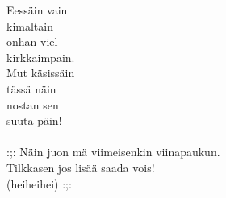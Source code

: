
Eessäin vain \\ kimaltain \\ onhan viel \\ kirkkaimpain. \\ Mut käsissäin \\ tässä näin \\ nostan sen \\ suuta päin! \\ \hspace{10mm} \\ :;: Näin juon mä viimeisenkin viinapaukun. \\ Tilkkasen jos lisää saada vois! \\ (heiheihei) :;: